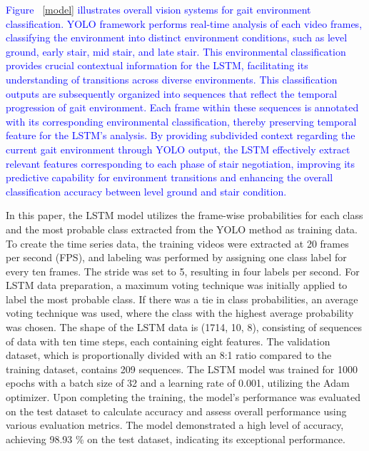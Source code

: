 \documentclass[journal,article,submit,pdftex,moreauthors]{Definitions/mdpi}
\begin{document}
\textcolor{blue}{Figure ~\ref{model} illustrates overall vision systems for gait environment classification. YOLO framework performs real-time analysis of each video frames, classifying the environment into distinct environment conditions, such as level ground, early stair, mid stair, and late stair. This environmental classification provides crucial contextual information for the LSTM, facilitating its understanding of transitions across diverse environments. This classification outputs are subsequently organized into sequences that reflect the temporal progression of gait environment. Each frame within these sequences is annotated with its corresponding environmental classification, thereby preserving temporal feature for the LSTM's analysis. By providing subdivided context regarding the current gait environment through YOLO output, the LSTM effectively extract relevant features corresponding to each phase of stair negotiation, improving its predictive capability for environment transitions and enhancing the overall classification accuracy between level ground and stair condition.}

In this paper, the LSTM model utilizes the frame-wise probabilities for each class and the most probable class extracted from the YOLO method as training data. To create the time series data, the training videos were extracted at 20 frames per second (FPS), and labeling was performed by assigning one class label for every ten frames. The stride was set to 5, resulting in four labels per second. For LSTM data preparation, a maximum voting technique was initially applied to label the most probable class. If there was a tie in class probabilities, an average voting technique was used, where the class with the highest average probability was chosen. The shape of the LSTM data is (1714, 10, 8), consisting of sequences of data with ten time steps, each containing eight features. The validation dataset, which is proportionally divided with an 8:1 ratio compared to the training dataset, contains 209 sequences.
The LSTM model was trained for 1000 epochs with a batch size of 32 and a learning rate of 0.001, utilizing the Adam optimizer. Upon completing the training, the model's performance was evaluated on the test dataset to calculate accuracy and assess overall performance using various evaluation metrics. The model demonstrated a high level of accuracy, achieving 98.93 \% on the test dataset, indicating its exceptional performance.
\end{document}
